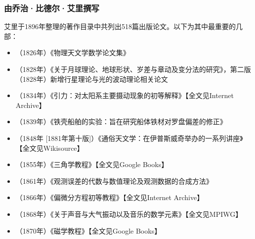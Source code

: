 \subsubsection{由乔治·比德尔·艾里撰写}
艾里于1896年整理的著作目录中共列出518篇出版论文。以下为其中最重要的几部：
\begin{itemize}
\item （1826年）《物理天文学数学论文集》
\item （1828年）《关于月球理论、地球形状、岁差与章动及变分法的研究》，第二版（1828年）新增行星理论与光的波动理论相关论文
\item （1834年）《引力：对太阳系主要摄动现象的初等解释》【全文见Internet Archive】
\item （1839年）《铁壳船舶的实验：旨在研究船体铁材对罗盘偏差的修正》
\item （1848年 [1881年第十版]）《通俗天文学：在伊普斯威奇举办的一系列讲座》【全文见Wikisource】
\item （1855年）《三角学教程》【全文见Google Books】
\item （1861年）《观测误差的代数与数值理论及观测数据的合成方法》
\item （1866年）《偏微分方程初等教程》【全文见Internet Archive】
\item （1868年）《关于声音与大气振动以及音乐的数学元素》【全文见MPIWG】
\item （1870年）《磁学教程》【全文见Google Books】
\end{itemize}
